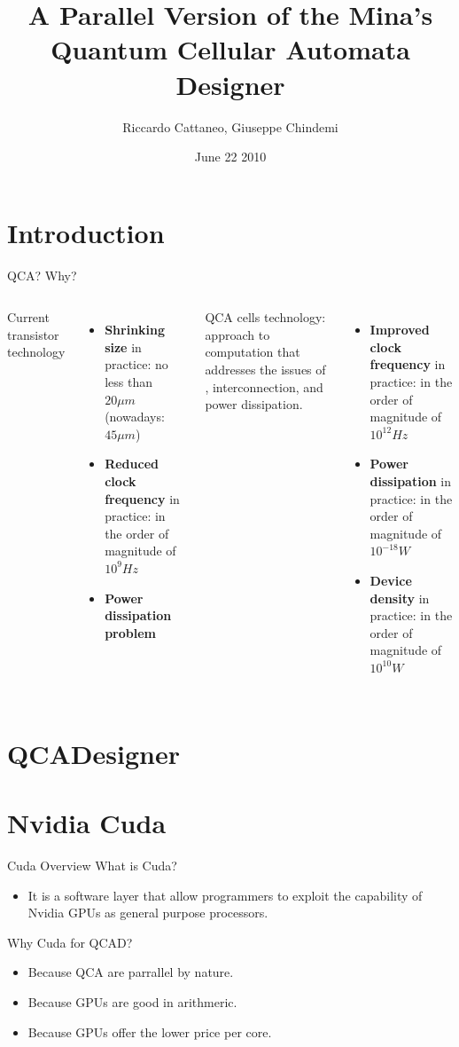 \documentclass[10pt, red]{beamer}
\title[CudaQCAD]{A Parallel Version of the Mina's Quantum Cellular Automata Designer}
\author{Riccardo Cattaneo, Giuseppe Chindemi}
\institute{
  Politecnico di Milano\\
  HPPS
}
\date{June 22 2010}
\begin{document}
\begin{frame}
  \titlepage
\end{frame}


\section{Introduction}
	\begin{frame}{QCA? Why?}
		\begin{columns}
		\centering
	
			Current transistor technology 
		 	\begin{itemize}
			 	\item	\textbf{Shrinking size} in practice: no less than $  20 \mu m $ (nowadays: $45\mu m$)
			 	\item \textbf{Reduced clock frequency} in practice: in the order of magnitude of $10^9 Hz$
			 	\item \textbf{Power dissipation problem}
		 	\end{itemize}
			 	
			QCA cells technology: approach to computation that addresses the issues of , interconnection, and power dissipation.
		 	\begin{itemize}
			 	\item \textbf{Improved clock frequency} in practice: in the order of magnitude of $10^{12} Hz$
			 	\item \textbf{Power dissipation} in practice: in the order of magnitude of $10^{-18} W$
			 	\item \textbf{Device density} in practice: in the order of magnitude of $10^{10} W$
		 	\end{itemize}

		\end{columns}
	\end{frame}


\section{QCADesigner}
	\begin{frame}{2}
	\end{frame}


\section{Nvidia Cuda}

	\begin{frame}{Cuda Overview}
		What is Cuda?		
		\begin{itemize}
			\item It is a software layer that allow programmers to exploit the capability of Nvidia GPUs as general purpose processors.
		\end{itemize}
		Why Cuda for QCAD?
		\begin{itemize}
			\item Because QCA are parrallel by nature.
			\item Because GPUs are good in arithmeric.
			\item Because GPUs offer the lower price per core.
		\end{itemize}
	\end{frame}
\end{document}
